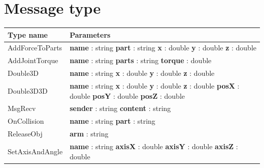 \documentclass[notitlepage]{report}
\begin{document}
\chapter{Message type}
\begin{supertabular}{|p{4cm}|p{5cm}|}
	\hline
    Type name & Parameters \\
    \hline
  	AddForceToParts & 
  		\textbf{name} : string\newline 
  		\textbf{part} : string\newline
  		\textbf{x} : double\newline
  		\textbf{y} : double\newline
  		\textbf{z} : double\\
  	\hline
  	AddJointTorque & 
  		\textbf{name} : string\newline 
  		\textbf{parts} : string\newline
  		\textbf{torque} : double\\
  	\hline
  	Double3D & 
  		\textbf{name} : string\newline 
  		\textbf{x} : double\newline
  		\textbf{y} : double\newline
  		\textbf{z} : double\\
  	\hline
  	Double3D3D & 
  		\textbf{name} : string\newline 
  		\textbf{x} : double\newline
  		\textbf{y} : double\newline
  		\textbf{z} : double\newline
  		\textbf{posX} : double\newline
  		\textbf{posY} : double\newline
  		\textbf{posZ} : double\\
  	\hline
  	MsgRecv & 
  		\textbf{sender} : string\newline 
  		\textbf{content} : string\\
  	\hline
  	OnCollision & 
  		\textbf{name} : string\newline 
  		\textbf{part} : string\\
  	\hline
  	ReleaseObj & 
  		\textbf{arm} : string\\
  	\hline
  	SetAxisAndAngle & 
  		\textbf{name} : string\newline 
  		\textbf{axisX} : double\newline
  		\textbf{axisY} : double\newline
  		\textbf{axisZ} : double\newline

\end{supertabular}
\end{document}
